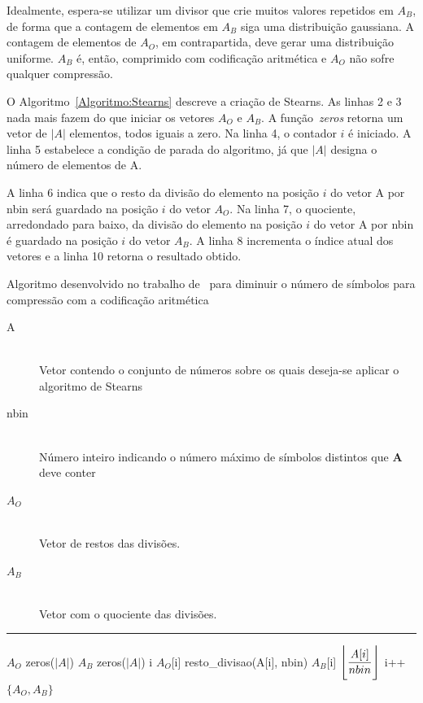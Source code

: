 Idealmente, espera-se utilizar um divisor que crie muitos valores repetidos em
$A_B$, de forma que a contagem de elementos em $A_B$ siga uma distribuição
gaussiana. A contagem de elementos de $A_O$, em contrapartida, deve gerar uma
distribuição uniforme. $A_B$ é, então, comprimido com codificação aritmética e
$A_O$ não sofre qualquer compressão. 

O Algoritmo~\ref{Algoritmo:Stearns} descreve a criação de Stearns. As linhas 2
e 3 nada mais fazem do que iniciar os vetores $A_O$ e $A_B$. A
função~\emph{zeros} retorna um vetor de $|A|$ elementos, todos iguais a zero.
Na linha 4, o contador $i$ é iniciado. A linha 5 estabelece a condição de parada do algoritmo,
já que $|A|$ designa o número de elementos de A.

A linha 6 indica que o resto da divisão do elemento na posição $i$ do vetor A
por nbin será guardado na posição $i$ do vetor $A_O$. Na linha 7, o quociente,
arredondado para baixo, da divisão do elemento na posição $i$ do vetor A por
nbin é guardado na posição $i$ do vetor $A_B$. A linha 8 incrementa o índice
atual dos vetores e a linha 10 retorna o resultado obtido.

\begin{algorithm}[ht]
\caption{Algoritmo desenvolvido no trabalho de~\citep{Artigo:stearn} para
diminuir o número de símbolos para compressão com a codificação aritmética}
\label{Algoritmo:Stearns}
\Entrada 
{
\begin{description}
  \item[A]\\
  	Vetor contendo o conjunto de números sobre os quais deseja-se aplicar o
  	algoritmo de Stearns
  \item[nbin]\\
  	Número inteiro indicando o número máximo de símbolos distintos que \textbf{A}
  	deve conter
\end{description}
}
\vspace{1mm}
\Saida
{
\begin{description}
  \item[$A_O$]\\
  	Vetor de restos das divisões.
  \item[$A_B$]\\
  	Vetor com o quociente das divisões.
\end{description}
}
\vspace{1mm}
\hrule
\vspace{1mm}
\Inicio
{
	$A_O$ \rec zeros($|A|$)\;
	$A_B$ \rec zeros($|A|$)\;
	i \;
	{
		$A_O$[i] \rec resto\_divisao(A[i], nbin)\;
		$A_B$[i] \rec $\displaystyle \floor[\Bigg]{\frac{A[i]}{nbin}}$\;
		i++\;
	}
	\Retorna $\{A_O, A_B\}$\;
}
\end{algorithm}

